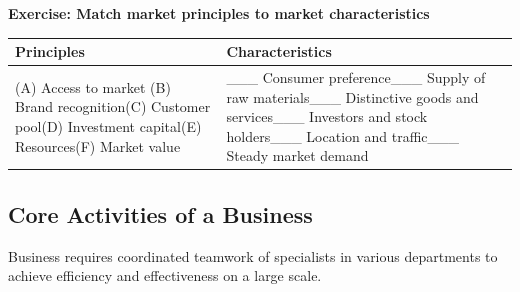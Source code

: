 \documentclass[]{book}
\let\BeginKnitrBlock\begin \let\EndKnitrBlock\end
\begin{document}
\BeginKnitrBlock{rmdexercise}
\textbf{Exercise: Match market principles to market characteristics}

\begin{longtable}[]{@{}ll@{}}
\toprule
\begin{minipage}[b]{0.44\columnwidth}\raggedright
Principles\strut
\end{minipage} & \begin{minipage}[b]{0.50\columnwidth}\raggedright
Characteristics\strut
\end{minipage}\tabularnewline
\midrule
\endhead
\begin{minipage}[t]{0.44\columnwidth}\raggedright
(A) Access to market \newline(B) Brand recognition\newline (C) Customer pool\newline(D) Investment capital\newline(E) Resources\newline(F) Market value\strut
\end{minipage} & \begin{minipage}[t]{0.50\columnwidth}\raggedright
\_\_\_ Consumer preference\newline  \_\_\_ Supply of raw materials\newline \_\_\_ Distinctive goods and services\newline\_\_\_ Investors and stock holders\newline \_\_\_ Location and traffic\newline\_\_\_ Steady market demand\strut
\end{minipage}\tabularnewline
\bottomrule
\end{longtable}
\EndKnitrBlock{rmdexercise}

\hypertarget{core-activities-of-a-business}{%
\subsection{Core Activities of a Business}\label{core-activities-of-a-business}}

Business requires coordinated teamwork of specialists in various departments to achieve efficiency and effectiveness on a large scale.
\end{document}
